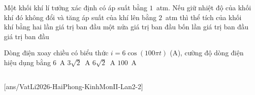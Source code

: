 	\begin{ex}%
		Một khối khí lí tưởng xác định có áp suất bằng $1$~atm. Nếu giữ nhiệt độ của khối khí đó không đổi và tăng áp suất của khí lên bằng $2$~atm thì thể tích của khối khí bằng
		\choice
		{hai lần giá trị ban đầu}
		{\True một nửa giá trị ban đầu}
		{bốn lần giá trị ban đầu}
		{giá trị ban đầu}
	\end{ex}

	\begin{ex}%
		Dòng điện xoay chiều có biểu thức $i=6\cos(100\pi t)$ (A), cường độ dòng điện hiệu dụng bằng
		\choice
		{$6$~A}
		{\True $3\sqrt{2}$~A}
		{$6\sqrt{2}$~A}
		{$100$~A}
	\end{ex}

	\subsection*{}
	\setcounter{ex}{0}
	[ans/VatLi2026-HaiPhong-KinhMonII-Lan2-2]

